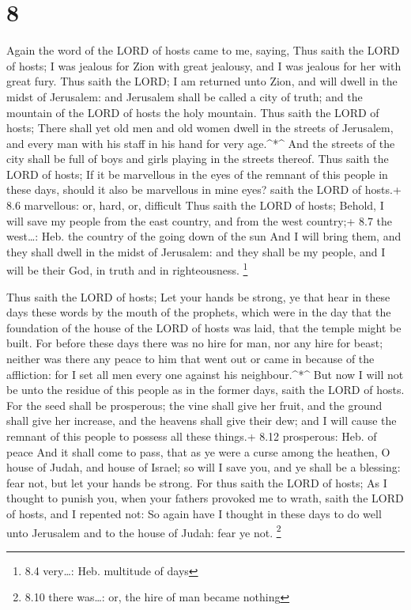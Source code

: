 \hypertarget{section-7}{%
\section{8}\label{section-7}}

 Again the word of the LORD of hosts came to me, saying,
 Thus saith the LORD of hosts; I was jealous for Zion with
great jealousy, and I was jealous for her with great fury. 
Thus saith the LORD; I am returned unto Zion, and will dwell in the
midst of Jerusalem: and Jerusalem shall be called a city of truth; and
the mountain of the LORD of hosts the holy mountain.  Thus
saith the LORD of hosts; There shall yet old men and old women dwell in
the streets of Jerusalem, and every man with his staff in his hand for
very age.\^{}*\^{}  And the streets of the city shall be
full of boys and girls playing in the streets thereof.  Thus
saith the LORD of hosts; If it be marvellous in the eyes of the remnant
of this people in these days, should it also be marvellous in mine eyes?
saith the LORD of hosts.+ 8.6 marvellous: or, hard, or, difficult
 Thus saith the LORD of hosts; Behold, I will save my people
from the east country, and from the west country;+ 8.7 the west\ldots:
Heb. the country of the going down of the sun  And I will
bring them, and they shall dwell in the midst of Jerusalem: and they
shall be my people, and I will be their God, in truth and in
righteousness. \footnote{8.4 very\ldots: Heb. multitude of days}

 Thus saith the LORD of hosts; Let your hands be strong, ye
that hear in these days these words by the mouth of the prophets, which
were in the day that the foundation of the house of the LORD of hosts
was laid, that the temple might be built.  For before these
days there was no hire for man, nor any hire for beast; neither was
there any peace to him that went out or came in because of the
affliction: for I set all men every one against his neighbour.\^{}*\^{}
 But now I will not be unto the residue of this people as
in the former days, saith the LORD of hosts.  For the seed
shall be prosperous; the vine shall give her fruit, and the ground shall
give her increase, and the heavens shall give their dew; and I will
cause the remnant of this people to possess all these things.+ 8.12
prosperous: Heb. of peace  And it shall come to pass, that
as ye were a curse among the heathen, O house of Judah, and house of
Israel; so will I save you, and ye shall be a blessing: fear not, but
let your hands be strong.  For thus saith the LORD of
hosts; As I thought to punish you, when your fathers provoked me to
wrath, saith the LORD of hosts, and I repented not:  So
again have I thought in these days to do well unto Jerusalem and to the
house of Judah: fear ye not. \footnote{8.10 there was\ldots: or, the
  hire of man became nothing}

